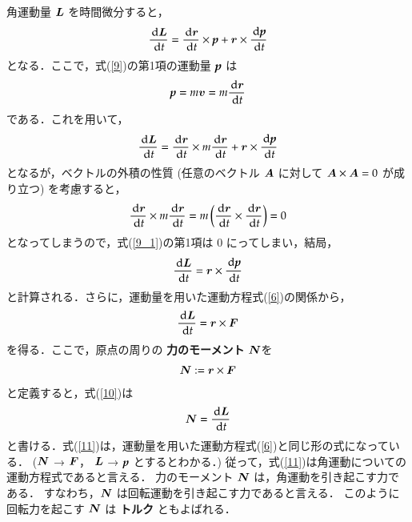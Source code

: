                 角運動量 $\boldsymbol{L}$ を時間微分すると，
                    \begin{align}\label{9}
                        \frac{\df\bL}{\df t}
                        = \frac{\df\br}{\df t} \times \textit{\textbf{p}}
                        +\br \times \frac{\df\textit{\textbf{p}}}{\df t}
                    \end{align}
                となる．ここで，式(\ref{9})の第1項の運動量 $\textit{\textbf{p}}$ は
                    \begin{align}
                        \textit{\textbf{p}} = m\boldsymbol{v}=m\frac{\,\mathrm{d}\boldsymbol{r}}{\,\mathrm{d} t}
                    \end{align}
                である．これを用いて，
                    \begin{align}\label{9_1}
                        \frac{\df\bL}{\df t}
                        = \frac{\df\br}{\df t} \times m\frac{\df\br}{\df t}
                        +\br \times \frac{\df\textit{\textbf{p}}}{\df t}
                    \end{align}
                となるが，ベクトルの外積の性質
                (任意のベクトル $\boldsymbol{A}$ に対して $\boldsymbol{A} \times \boldsymbol{A}=0$ が成り立つ)
                を考慮すると，
                    \begin{align}
                        \frac{\,\mathrm{d}\boldsymbol{r}}{\,\mathrm{d} t} \times m\frac{\,\mathrm{d}\boldsymbol{r}}{\,\mathrm{d} t}
                        =m\left( \frac{\,\mathrm{d}\boldsymbol{r}}{\,\mathrm{d} t} \times \frac{\,\mathrm{d}\boldsymbol{r}}{\,\mathrm{d} t} \right)=0
                    \end{align}
                となってしまうので，式(\ref{9_1})の第1項は 0 にってしまい，結局，
                    \begin{align}
                        \frac{\,\mathrm{d}\boldsymbol{L}}{\,\mathrm{d} t} = \boldsymbol{r} \times \frac{\,\mathrm{d}\textit{\textbf{p}}}{\,\mathrm{d} t}
                    \end{align}
                と計算される．さらに，運動量を用いた運動方程式(\ref{6})の関係から，
                    \begin{align}\label{10}
                        \frac{\df\bL}{\df t} = \br \times \bF
                    \end{align}
                を得る．ここで，原点の周りの \textbf{力のモーメント} $\boldsymbol{N}$を
                    \begin{align}\label{12}
                        \bN := \br \times \bF
                    \end{align}
                と定義すると，式(\ref{10})は
                    \begin{align}\label{11}
                        \bN = \frac{\df\bL}{\df t}
                    \end{align}
                と書ける．式(\ref{11})は，運動量を用いた運動方程式(\ref{6})と同じ形の式になっている．
                ($\boldsymbol{N}$ → $\boldsymbol{F}$，
                $\boldsymbol{L}$ → $\textit{\textbf{p}}$ とするとわかる．)
                従って，式(\ref{11})は角運動についての運動方程式であると言える．
                力のモーメント $\boldsymbol{N}$ は，角運動を引き起こす力である．
                すなわち，$\boldsymbol{N}$ は回転運動を引き起こす力であると言える．
                このように回転力を起こす $\boldsymbol{N}$ は \textbf{トルク} ともよばれる．

